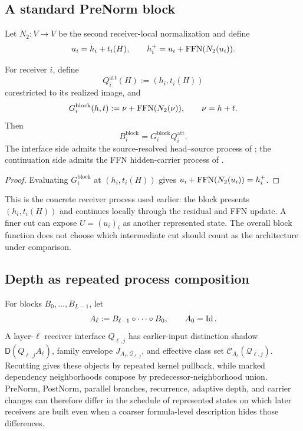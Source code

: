 \subsection{A standard PreNorm block}

Let $N_2:V\to V$ be the second receiver-local normalization and define
\[
u_i=h_i+t_i(H),
\qquad
h_i^+=u_i+\operatorname{FFN}(N_2(u_i)).
\]

\begin{theorem}\label{thm:prenorm-v13}
For receiver $i$, define
\[
Q_i^{\mathrm{att}}(H):=(h_i,t_i(H))
\]
corestricted to its realized image, and
\[
G_i^{\mathrm{block}}(h,t):=\nu+\operatorname{FFN}(N_2(\nu)),
\qquad
\nu=h+t.
\]
Then
\[
\boxed{B_i^{\mathrm{block}}=G_i^{\mathrm{block}}Q_i^{\mathrm{att}}.}
\]
The interface side admits the source-resolved head--source process of ; the continuation side admits the FFN hidden-carrier process of .
\end{theorem}

\begin{proof}
Evaluating $G_i^{\mathrm{block}}$ at $(h_i,t_i(H))$ gives $u_i+\operatorname{FFN}(N_2(u_i))=h_i^+$.
\end{proof}

This is the concrete receiver process used earlier: the block presents $(h_i,t_i(H))$ and continues locally through the residual and FFN update. A finer cut can expose $U=(u_i)_i$ as another represented state. The overall block function does not choose which intermediate cut should count as the architecture under comparison.

\subsection{Depth as repeated process composition}

For blocks $B_0,\ldots,B_{L-1}$, let
\[
A_\ell:=B_{\ell-1}\circ\cdots\circ B_0,
\qquad A_0=\operatorname{Id}.
\]
A layer-$\ell$ receiver interface $Q_{\ell,j}$ has earlier-input distinction shadow $\mathsf D(Q_{\ell,j}A_\ell)$, family envelope $J_{A_\ell,\mathcal Q_{\ell,j}}$, and effective class set $\mathcal C_{A_\ell}(\mathcal Q_{\ell,j})$. Recutting gives these objects by repeated kernel pullback, while marked dependency neighborhoods compose by predecessor-neighborhood union. PreNorm, PostNorm, parallel branches, recurrence, adaptive depth, and carrier changes can therefore differ in the schedule of represented states on which later receivers are built even when a coarser formula-level description hides those differences.

